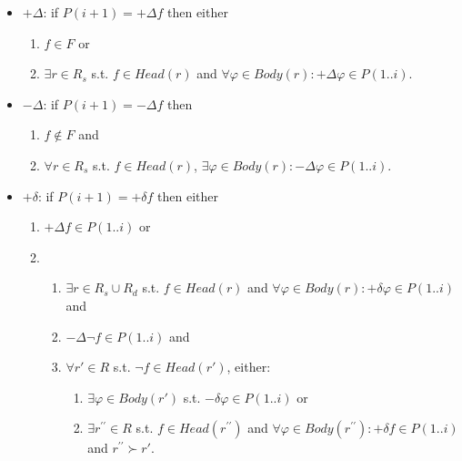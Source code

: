 \documentclass[version=3.21, pagesize, twoside=off, bibliography=totoc, DIV=calc, fontsize=12pt, a4paper, french, english]{scrartcl}
\begin{document}
\begin{itemize}
\item $+\Delta$: if $P(i+1) = +\Delta f$ then either
  \begin{enumerate}
  \item $f \in F$ or
  \item $\exists r \in R_s$ s.t. $f \in Head(r)$ and $\forall \varphi \in Body(r): +\Delta \varphi \in P(1..i)$.
  \end{enumerate}

\item $-\Delta$: if $P(i+1) = -\Delta f$ then
  \begin{enumerate}
  \item $f \notin F$ and
  \item $\forall r \in R_s$ s.t. $f \in Head(r)$, $\exists \varphi \in Body(r): -\Delta \varphi \in P(1..i)$.
  \end{enumerate}

\item $+\delta$: if $P(i+1) = +\delta f$ then either
  \begin{enumerate}
  \item $+\Delta f \in P(1..i)$ or
  \item \vspace{-0.1cm}
    \begin{enumerate}
    \item $\exists r \in R_s \cup R_d$ s.t. $f \in Head(r)$ and $\forall \varphi \in Body(r): +\delta \varphi \in P(1..i)$ and
    \item $-\Delta \lnot f \in P(1..i)$ and
    \item $\forall r' \in R$ s.t. $\lnot f \in Head(r')$, either:
      \begin{enumerate}
      \item $\exists \varphi \in Body(r')$ s.t. $-\delta \varphi \in P(1..i)$ or
      \item $\exists r^{\prime\prime} \in R$ s.t. $f \in Head(r^{\prime\prime})$ and $\forall \varphi \in Body(r^{\prime\prime}): +\delta f \in P(1..i)$ and $r^{\prime\prime} \succ r'$.
      \end{enumerate}
    \end{enumerate}
  \end{enumerate}


\end{itemize}
\end{document}
